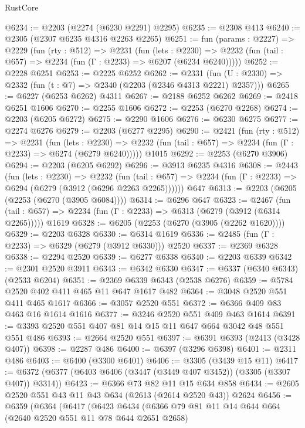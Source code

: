 \begin{lexlean}{RustCore}
\begin{coremodule}
@6234 := @2203 (@2274 (@6230 @2291) @2295)
@6235 := @2308 @413
@6240 := @2305 (@2307 @6235 @4316 @2263 @2265)
@6251 := fun (params : @2227) =>
  @2229
    (fun (rty : @512) =>
    @2231
      (fun (lets : @2230) =>
      @2232 (fun (tail : @657) => @2234 (fun (Γ : @2233) => @6207 (@6234 @6240)))))
@6252 := @2228 @6251
@6253 := @2225 @6252
@6262 := @2331 (fun (U : @2330) => @2332 (fun (t : @7) => @2340 (@2203 (@2346 @4313 @2221) @2357)))
@6265 := @6227 (@6253 @6262) @4311
@6267 := @2188 @6252 @6262
@6269 := @2418 @6251 @1606
@6270 := @2255 @1606
@6272 := @2253 (@6270 @2268)
@6274 := @2203 (@6205 @6272)
@6275 := @2290 @1606
@6276 := @6230 @6275
@6277 := @2274 @6276
@6279 := @2203 (@6277 @2295)
@6290 := @2421
    (fun (rty : @512) =>
    @2231
      (fun (lets : @2230) =>
      @2232 (fun (tail : @657) => @2234 (fun (Γ : @2233) => @6274 (@6279 @6240)))))
    @1015
@6292 := @2253 (@6270 @3906)
@6294 := @2203 (@6205 @6292)
@6296 := @3913 @6235 @4316
@6308 := @2443
    (fun (lets : @2230) =>
    @2232
      (fun (tail : @657) => @2234 (fun (Γ : @2233) => @6294 (@6279 (@3912 (@6296 @2263 @2265))))))
    @647
@6313 := @2203 (@6205 (@2253 (@6270 (@3905 @6084))))
@6314 := @6296 @647
@6323 := @2467
    (fun (tail : @657) => @2234 (fun (Γ : @2233) => @6313 (@6279 (@3912 (@6314 @2265)))))
    @1619
@6328 := @6205 (@2253 (@6270 (@3905 (@2262 @1620))))
@6329 := @2203 @6328
@6330 := @6314 @1619
@6336 := @2485 (fun (Γ : @2233) => @6329 (@6279 (@3912 @6330))) @2520
@6337 := @2369 @6328
@6338 := @2294 @2520
@6339 := @6277 @6338
@6340 := @2203 @6339
@6342 := @2301 @2520 @3911
@6343 := @6342 @6330
@6347 := @6337 (@6340 @6343) (@2533 @6204)
@6351 := @2369 @6339 @6343 (@2538 @6276)
@6359 := @5784 @2520 @402 @411 @465 @11 @647 @1617 @482
@6364 := @3048 @2520 @551 @411 @465 @1617
@6366 := @3057 @2520 @551
@6372 := @6366 @409 @83 @463 @16 @1614 @1616
@6377 := @3246 @2520 @551 @409 @463 @1614
@6391 := @3393 @2520 @551 @407 @81 @14 @15 @11 @647 @664 @3042 @48 @551 @551 @486
@6393 := @2664 @2520 @551
@6397 := @6391 @6393 (@2413 (@3428 @407))
@6398 := @2287 @486
@6400 := @6397 (@3296 @6398)
@6401 := @2311 @486
@6403 := @6400 (@3300 @6401)
@6406 := @3305 (@3439 @15 @11)
@6417 := @6372 (@6377 (@6403 @6406 (@3447 (@3449 @407 @3452)) (@3305 (@3307 @407)) @3314))
@6423 := @6366 @73 @82 @11 @15 @634 @858
@6434 := @2605 @2520 @551 @43 @11 @43 @634 (@2613 (@2614 @2520 @43)) @2624
@6456 := @6359
    (@6364
      (@6417
        (@6423
          @6434
          (@6366
            @79
            @81
            @11
            @14
            @644
            @664
            (@2640 @2520 @551 @11 @78 @644 @2651 @2658)

\end{coremodule}
\end{lexlean}
